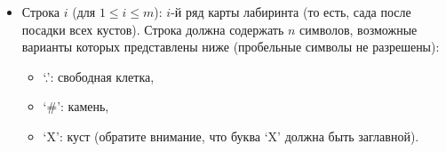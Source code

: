 \begin{itemize}
\item Строка $i$ (для $1 \leq i \leq m$): $i$-й ряд карты лабиринта (то есть, сада после посадки всех кустов). Строка должна содержать $n$ символов, возможные варианты которых
представлены ниже (пробельные символы не разрешены):
\begin{itemize}
\item `.': свободная клетка,
\item `\#': камень,
\item `X': куст (обратите внимание, что буква `X' должна быть заглавной).
\end{itemize}
\end{itemize}